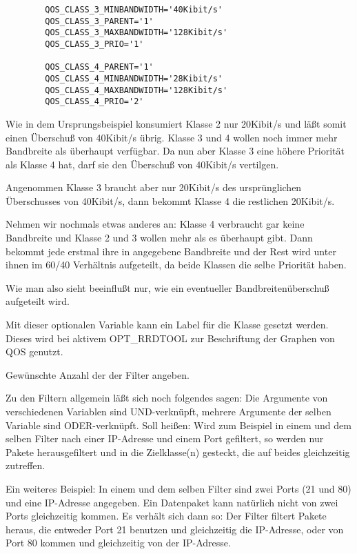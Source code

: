 \begin{description}
\begin{example}
\begin{verbatim}
        QOS_CLASS_3_MINBANDWIDTH='40Kibit/s'
        QOS_CLASS_3_PARENT='1'
        QOS_CLASS_3_MAXBANDWIDTH='128Kibit/s'
        QOS_CLASS_3_PRIO='1'

        QOS_CLASS_4_PARENT='1'
        QOS_CLASS_4_MINBANDWIDTH='28Kibit/s'
        QOS_CLASS_4_MAXBANDWIDTH='128Kibit/s'
        QOS_CLASS_4_PRIO='2'
\end{verbatim}
\end{example}


   Wie in dem Ursprungsbeispiel konsumiert Klasse 2 nur 20Kibit/s und läßt
   somit einen Überschuß von 40Kibit/s übrig. Klasse 3 und 4 wollen noch
   immer mehr Bandbreite als überhaupt verfügbar. Da nun aber Klasse 3
   eine höhere Priorität als Klasse 4 hat, darf sie den Überschuß von
   40Kibit/s vertilgen.

   Angenommen Klasse 3 braucht aber nur 20Kibit/s des ursprünglichen
   Überschusses von 40Kibit/s, dann bekommt Klasse 4 die restlichen 20Kibit/s.

   Nehmen wir nochmals etwas anderes an: Klasse 4 verbraucht gar keine
   Bandbreite und Klasse 2 und 3 wollen mehr als es überhaupt gibt. Dann
   bekommt jede erstmal ihre in  angegebene
   Bandbreite und der Rest wird unter ihnen im 60/40 Verhältnis
   aufgeteilt, da beide Klassen die selbe Priorität haben.

   Wie man also sieht beeinflußt  nur, wie ein
   eventueller Bandbreitenüberschuß aufgeteilt wird.
   

   Mit dieser optionalen Variable kann ein Label für die Klasse gesetzt werden.
   Dieses wird bei aktivem OPT\_RRDTOOL zur Beschriftung der Graphen von QOS
   genutzt.



   Gewünschte Anzahl der der Filter angeben.

   Zu den Filtern allgemein läßt sich noch folgendes sagen:
   Die Argumente von verschiedenen Variablen sind UND-verknüpft, mehrere
   Argumente der selben Variable sind ODER-verknüpft. Soll heißen: Wird
   zum Beispiel in einem und dem selben Filter nach einer IP-Adresse und
   einem Port gefiltert, so werden nur Pakete herausgefiltert und in die
   Zielklasse(n) gesteckt, die auf beides gleichzeitig zutreffen.

   Ein weiteres Beispiel:
   In einem und dem selben Filter sind zwei Ports (21 und 80) und eine
   IP-Adresse angegeben. Ein Datenpaket kann natürlich nicht von zwei
   Ports gleichzeitig kommen. Es verhält sich dann so: Der Filter filtert
   Pakete heraus, die entweder Port 21 benutzen und gleichzeitig die
   IP-Adresse, oder von Port 80 kommen und gleichzeitig von der
   IP-Adresse.


\end{description}
